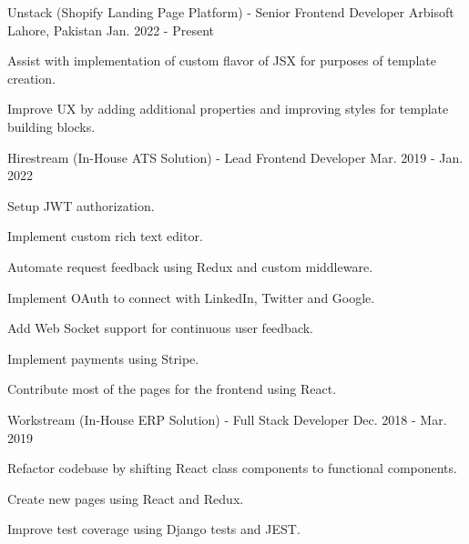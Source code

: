 

\begin{cventries}

  \cventry
    {Unstack (Shopify Landing Page Platform) - Senior Frontend Developer} %
    {Arbisoft} %
    {Lahore, Pakistan} %
    {Jan. 2022 - Present} %
    {
      \begin{cvitems} %
        \item {Assist with implementation of custom flavor of JSX for purposes of template creation.}
        \item {Improve UX by adding additional properties and improving styles for template building blocks.}
      \end{cvitems}
    }
    
  \cventry
    {Hirestream (In-House ATS Solution) - Lead Frontend Developer} %
    {} %
    {} %
    {Mar. 2019 - Jan. 2022} %
    {
      \begin{cvitems} %
        \item {Setup JWT authorization.}
        \item {Implement custom rich text editor.}
        \item {Automate request feedback using Redux and custom middleware.}
        \item {Implement OAuth to connect with LinkedIn, Twitter and Google.}
        \item {Add Web Socket support for continuous user feedback.}
        \item {Implement payments using Stripe.}
        \item {Contribute most of the pages for the frontend using React.}
      \end{cvitems}
    }

  \cventry
    {Workstream (In-House ERP Solution) - Full Stack Developer} %
    {} %
    {} %
    {Dec. 2018 - Mar. 2019} %
    {
      \begin{cvitems} %
        \item {Refactor codebase by shifting React class components to functional components.}
        \item {Create new pages using React and Redux.}
        \item {Improve test coverage using Django tests and JEST.}
      \end{cvitems}
    }


\end{cventries}
